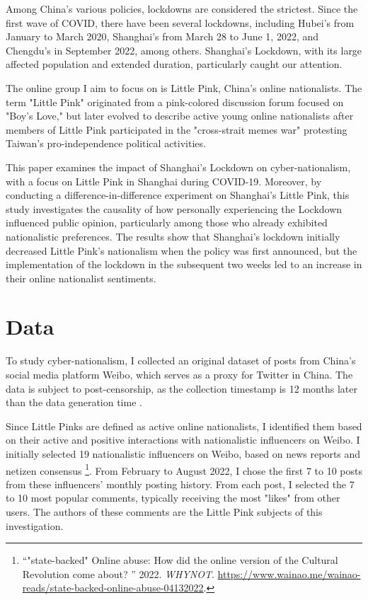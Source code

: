 \documentclass[12pt, ]{article}
\begin{document}
Among China's various policies, lockdowns are considered the strictest. Since the first wave of COVID, there have been several lockdowns, including Hubei’s from January to March 2020, Shanghai’s from March 28 to June 1, 2022, and Chengdu’s in September 2022, among others. Shanghai's Lockdown, with its large affected population and extended duration, particularly caught our attention. 

The online group I aim to focus on is Little Pink, China’s online nationalists. The term "Little Pink" originated from a pink-colored discussion forum focused on "Boy's Love," but later evolved to describe active young online nationalists after members of Little Pink participated in the "cross-strait memes war" protesting Taiwan's pro-independence political activities\citep{fang2018demystifying}.

This paper examines the impact of Shanghai's Lockdown on cyber-nationalism, with a focus on Little Pink in Shanghai during COVID-19. Moreover, by conducting a difference-in-difference experiment on Shanghai's Little Pink, this study investigates the causality of how personally experiencing the Lockdown influenced public opinion, particularly among those who already exhibited nationalistic preferences. The results show that Shanghai’s lockdown initially decreased Little Pink’s nationalism when the policy was first announced, but the implementation of the lockdown in the subsequent two weeks led to an increase in their online nationalist sentiments.


\hypertarget{data}{%
\section{Data}\label{data}}

To study cyber-nationalism, I collected an original dataset of posts from China’s social media platform Weibo, which serves as a proxy for Twitter in China. The data is subject to post-censorship, as the collection timestamp is 12 months later than the data generation time \citep{king2013censorship}.

Since Little Pinks are defined as active online nationalists, I identified them based on their active and positive interactions with nationalistic influencers on Weibo. I initially selected 19 nationalistic influencers on Weibo, based on news reports and netizen consensus \footnote{``"state-backed" Online abuse: How did the online version of the Cultural Revolution come about? '' 2022. \emph{WHYNOT}.
  \url{https://www.wainao.me/wainao-reads/state-backed-online-abuse-04132022}.}. From February to August 2022, I chose the first 7 to 10 posts from these influencers' monthly posting history. From each post, I selected the 7 to 10 most popular comments, typically receiving the most "likes" from other users. The authors of these comments are the Little Pink subjects of this investigation.
\end{document}
